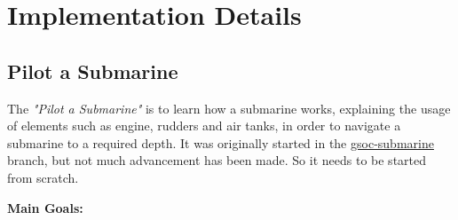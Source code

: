 \documentclass[preprint,12pt]{elsarticle}
\begin{document}







\section{Implementation Details}
\label{S:1}

\subsection{Pilot a Submarine}

The  \textit{"Pilot a Submarine"} is to learn how a submarine works, explaining the usage of elements such as engine, rudders and air tanks, in order to navigate a submarine to a required depth. It was originally started in the \href{https://cgit.kde.org/gcompris.git/log/?h=gsoc-submarine}{gsoc-submarine} branch, but not much advancement has been made. So it needs to be started from scratch.

\textbf{Main Goals:}
\end{document}
